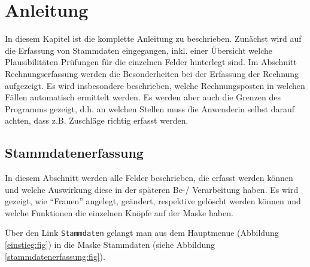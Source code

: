 





\chapter {Anleitung\label{anleitung}}
In diesem Kapitel ist die komplette Anleitung zu \tinyHeb\/ beschrieben. Zunächst wird auf die Erfassung von Stammdaten eingegangen, inkl. einer Übersicht 
welche Plausibilitäten Prüfungen für die einzelnen Felder hinterlegt sind.
Im Abschnitt Rechnungserfassung werden die Besonderheiten bei der
Erfassung der Rechnung aufgezeigt. Es wird insbesondere beschrieben, welche
Rechnungsposten in welchen Fällen automatisch ermittelt werden. Es werden
aber auch die Grenzen des Programms gezeigt, d.h. an welchen Stellen muss
die Anwenderin selbst darauf achten, dass z.B. Zuschläge richtig erfasst
werden.

\section{Stammdatenerfassung\label{stammdatenerfassung:kap}}
In diesem Abschnitt werden alle Felder beschrieben, die erfasst werden
können und welche Auswirkung diese in der späteren Be-/ Verarbeitung haben.
Es wird gezeigt, wie ``Frauen'' angelegt, geändert,
respektive gelöscht werden können und
welche Funktionen die einzelnen Knöpfe auf der Maske haben.\par
Über den Link \verb|Stammdaten| gelangt man aus dem Hauptmenue 
(Abbildung \vref{einstieg:fig}) in die Maske Stammdaten
(siehe Abbildung \vref{stammdatenerfassung:fig}).

